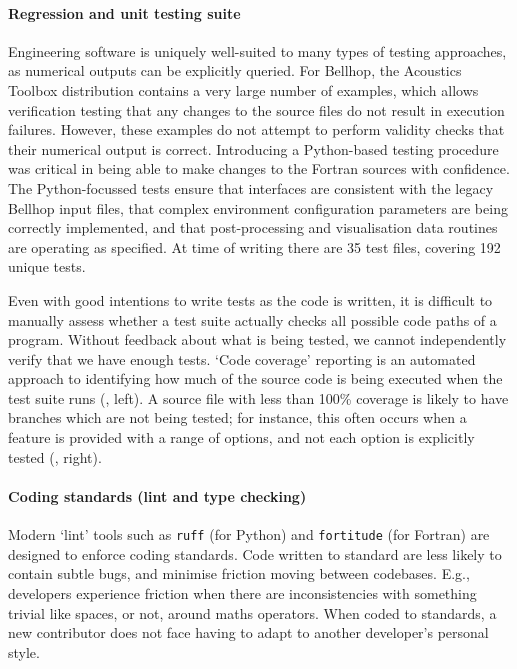 \documentclass{internoise2026-wr}
\begin{document}
\paragraph{Regression and unit testing suite}

Engineering software is uniquely well-suited to many types of testing approaches, as numerical outputs can be explicitly queried.
For Bellhop, the Acoustics Toolbox distribution contains a very large number of examples, which allows verification testing that any changes to the source files do not result in execution failures.
However, these examples do not attempt to perform validity checks that their numerical output is correct.
Introducing a Python-based testing procedure was critical in being able to make changes to the Fortran sources with confidence.
The Python-focussed tests ensure that interfaces are consistent with the legacy Bellhop input files, that complex environment configuration parameters are being correctly implemented, and that post-processing and visualisation data routines are operating as specified.
At time of writing there are 35 test files, covering 192 unique tests.

Even with good intentions to write tests as the code is written, it is difficult to manually assess whether a test suite actually checks all possible code paths of a program.
Without feedback about what is being tested, we cannot independently verify that we have enough tests.
`Code coverage' reporting is an automated approach to identifying how much of the source code is being executed when the test suite runs (, left).
A source file with less than 100\% coverage is likely to have branches which are not being tested; for instance, this often occurs when a feature is provided with a range of options, and not each option is explicitly tested (, right).



\paragraph{Coding standards (lint and type checking)}

Modern `lint' tools such as \verb|ruff| (for Python) and \verb|fortitude| (for Fortran) are designed to enforce coding standards.
Code written to standard are less likely to contain subtle bugs, and minimise friction moving between codebases.
E.g., developers experience friction when there are inconsistencies with something trivial like spaces, or not, around maths operators.
When coded to standards, a new contributor does not face having to adapt to another developer's personal style.
\end{document}
